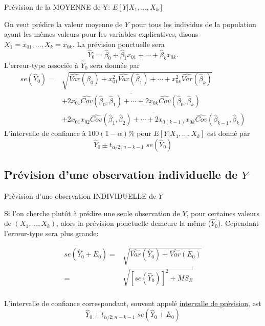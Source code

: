 \documentclass{BeamerTemplate}
\begin{document}
\begin{frame}[t]{Prévision de la MOYENNE de Y: $E[Y|X_1, ..., X_k]$}

{\small
On veut prédire la \alert{valeur moyenne} de $Y$ pour tous les individus de la population ayant les m\^emes valeurs pour les variables explicatives, disons $X_1=x_{01},\ldots,X_k=x_{0k}$. La prévision ponctuelle sera
$$
\hat{Y}_0=\hat{\beta}_0+\hat{\beta}_1x_{01}+\cdots+\hat{\beta}_kx_{0k}.
$$
L'erreur-type associée à $\hat Y_0$ sera donnée par
}
{\footnotesize
$$\begin{array}{ll}
se(\hat Y_0)=&\sqrt{\widehat{Var}(\hat{\beta}_0)+x^2_{01}\widehat{Var}(\hat{\beta}_1)+\cdots
+x_{0k}^2\widehat{Var}(\hat{\beta}_k)}\\
 &\overline{+2x_{01}\widehat{Cov}(\hat{\beta}_0,\hat{\beta}_1)+\cdots+2x_{0k}\widehat{Cov}(\hat{\beta}_0,\hat{\beta}_k)}\\
&\overline{+2x_{01}x_{02}\widehat{Cov}(\hat{\beta}_{1},\hat{\beta}_2)+\cdots+2x_{0(k-1)}x_{0k}\widehat{Cov}(\hat{\beta}_{k-1},\hat{\beta}_k)}
\end{array}$$
L'intervalle de confiance à $100(1-\alpha)\%$ pour $E[Y|X_1, ..., X_k]$ est donné par
\alert{$$\hat{Y}_0\pm t_{\alpha/2;\,n-k-1}\;se(\hat Y_0) $$}
}
\end{frame}


\subsection{Prévision d'une observation individuelle de $Y$}

\begin{frame}[t]{Prévision d'une observation INDIVIDUELLE de $Y$}

{\small
Si l'on cherche plut\^ot à prédire \alert{une seule observation} de $Y$, pour certaines valeurs de $(X_1,...,X_k)$, alors la prévision ponctuelle demeure la m\^eme ($\hat Y_0$). Cependant l'erreur-type sera plus grande:
}

{\footnotesize
$$\begin{array}{rl}
se(\hat Y_0+E_0)= & \sqrt{\widehat{Var}(\hat Y_0)+\widehat{Var}(E_0)}\\
        =&\sqrt{[se(\hat Y_0)]^2+  MS_E}\\
 & \end{array}$$

L'intervalle de confiance correspondant, souvent appelé \underline{intervalle de prévision}, est \alert{$$\hat{Y}_0\pm t_{\alpha/2;n-k-1}\;se(\hat Y_0+E_0)$$}
}
\end{frame}
\end{document}
